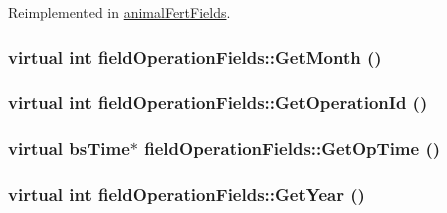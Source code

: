 Reimplemented in \hyperlink{classanimal_fert_fields_a92bb741105761340a580dba156326c93}{animalFertFields}.\hypertarget{classfield_operation_fields_ab99d866323e83c4c7399b59cbe6d51f3}{
\subsubsection[{GetMonth}]{\setlength{\rightskip}{0pt plus 5cm}virtual int fieldOperationFields::GetMonth ()}}
\label{classfield_operation_fields_ab99d866323e83c4c7399b59cbe6d51f3}
\hypertarget{classfield_operation_fields_a8981c417041bf7188a41df2881b244fb}{
\subsubsection[{GetOperationId}]{\setlength{\rightskip}{0pt plus 5cm}virtual int fieldOperationFields::GetOperationId ()}}
\label{classfield_operation_fields_a8981c417041bf7188a41df2881b244fb}
\hypertarget{classfield_operation_fields_a31ce7910466fadb0a560eb7e56b001e8}{
\subsubsection[{GetOpTime}]{\setlength{\rightskip}{0pt plus 5cm}virtual {\bf bsTime}$\ast$ fieldOperationFields::GetOpTime ()}}
\label{classfield_operation_fields_a31ce7910466fadb0a560eb7e56b001e8}
\hypertarget{classfield_operation_fields_afbf28b06e95ccb00f99383765e080c29}{
\subsubsection[{GetYear}]{\setlength{\rightskip}{0pt plus 5cm}virtual int fieldOperationFields::GetYear ()}}
